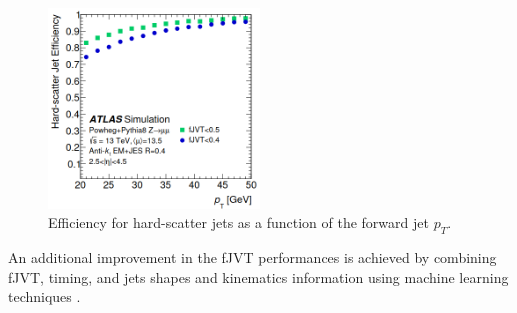 \begin{figure}[htbp]
    \centering
    \includegraphics[width=0.5\textwidth]{Ch4/Img/fJVT_Eff.png}
    \caption{Efficiency for hard-scatter jets as a function of the forward jet $p_T$.}
    \label{fig:Jet:Tag:JVT:Eff}
\end{figure}
An additional improvement in the fJVT performances is achieved by combining fJVT, timing, and jets shapes and kinematics information using machine learning techniques \cite{Louis_Thesis}. 

